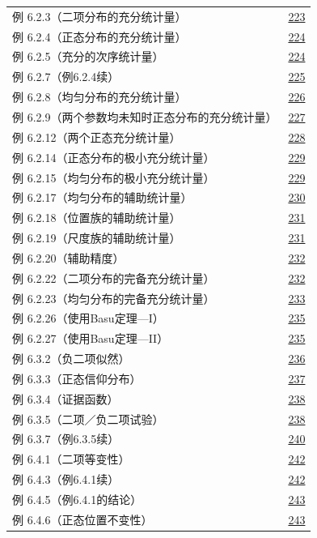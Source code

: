 \begin{longtable}{@{}p{}r@{}}
\addlinespace[.5em]
例 6.2.3（二项分布的充分统计量） & \hyperref[ex:6.2.3]{223} \\
例 6.2.4（正态分布的充分统计量） & \hyperref[ex:6.2.4]{224} \\
例 6.2.5（充分的次序统计量） & \hyperref[ex:6.2.5]{224} \\
例 6.2.7（例6.2.4续） & \hyperref[ex:6.2.7]{225} \\
例 6.2.8（均匀分布的充分统计量） & \hyperref[ex:6.2.8]{226} \\
例 6.2.9（两个参数均未知时正态分布的充分统计量） & \hyperref[ex:6.2.9]{227} \\
例 6.2.12（两个正态充分统计量） & \hyperref[ex:6.2.12]{228} \\
例 6.2.14（正态分布的极小充分统计量） & \hyperref[ex:6.2.14]{229} \\
例 6.2.15（均匀分布的极小充分统计量） & \hyperref[ex:6.2.15]{229} \\
例 6.2.17（均匀分布的辅助统计量） & \hyperref[ex:6.2.17]{230} \\
例 6.2.18（位置族的辅助统计量） & \hyperref[ex:6.2.18]{231} \\
例 6.2.19（尺度族的辅助统计量） & \hyperref[ex:6.2.19]{231} \\
例 6.2.20（辅助精度） & \hyperref[ex:6.2.20]{232} \\
例 6.2.22（二项分布的完备充分统计量） & \hyperref[ex:6.2.22]{232} \\
例 6.2.23（均匀分布的完备充分统计量） & \hyperref[ex:6.2.23]{233} \\
例 6.2.26（使用Basu定理—I） & \hyperref[ex:6.2.26]{235} \\
例 6.2.27（使用Basu定理—II） & \hyperref[ex:6.2.27]{235} \\
例 6.3.2（负二项似然） & \hyperref[ex:6.3.2]{236} \\
例 6.3.3（正态信仰分布） & \hyperref[ex:6.3.3]{237} \\
例 6.3.4（证据函数） & \hyperref[ex:6.3.4]{238} \\
例 6.3.5（二项／负二项试验） & \hyperref[ex:6.3.5]{238} \\
例 6.3.7（例6.3.5续） & \hyperref[ex:6.3.7]{240} \\
例 6.4.1（二项等变性） & \hyperref[ex:6.4.1]{242} \\
例 6.4.3（例6.4.1续） & \hyperref[ex:6.4.3]{242} \\
例 6.4.5（例6.4.1的结论） & \hyperref[ex:6.4.5]{243} \\
例 6.4.6（正态位置不变性） & \hyperref[ex:6.4.6]{243} \\

\end{longtable}

